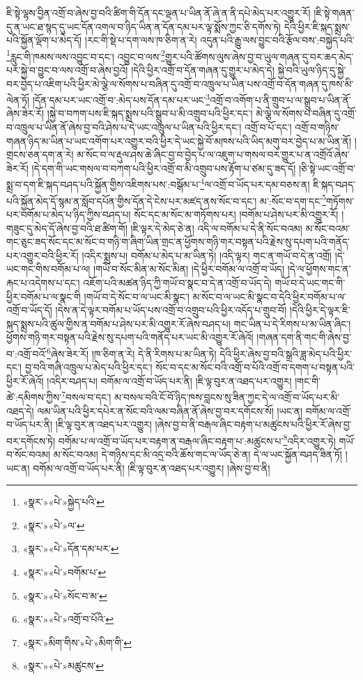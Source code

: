 ཇི་སྟེ་ལྷས་བྱིན་འགྲོ་བ་ཞེས་བྱ་བའི་ཚིག་གི་དོན་དང་ལྡན་པ་ཡིན་ནོ་ཞེ་ན་ནི་དཔེ་མེད་པར་འགྱུར་རོ། །ཇི་སྟེ་གཞན་དུ་ན་ཡང་ཐ་སྙད་དུ་ཡང་དོན་འགལ་བ་ཉིད་ཡིན་ན་དོན་དམ་པར་ལྟ་སྨོས་ཀྱང་ཅི་དགོས་ཏེ། དེའི་ཕྱིར་ཇི་སྐད་སྨྲས་པའི་སྐྱོན་ལྡོག་པ་མེད་དོ། །རང་གི་སྡེ་པ་དག་ལས་ཁ་ཅིག་ན་རེ། འདུན་པའི་རྒྱུ་ལས་བྱུང་བའི་རྩོལ་བས་:བསྐྱེད་པའི་\footnote{«སྣར་»«པེ་»སྐྱེད་པའི་}རླུང་གི་ཁམས་ལས་འབྱུང་བ་དང་། འབྱུང་བ་ལས་\footnote{«སྣར་»«པེ་»ལ་}གྱུར་པའི་ཚོགས་ལུས་ཞེས་བྱ་བ་ཡུལ་གཞན་དུ་བར་ཆད་མེད་པར་སྐྱེ་བ་བྱུང་བ་ལས་འགྲོ་བ་ཞེས་བྱའོ། །དེའི་ཕྱིར་འགྲོ་བ་དོན་གཞན་དུ་གྱུར་པ་མེད་དེ། སྐྱེ་བའི་ཡུལ་ཉིད་དུ་སྐྱེ་བར་བྱེད་པ་འཇིག་པའི་ཕྱིར་མེ་ལྕེ་ལ་སོགས་པ་བཞིན་དུ་འགྲོ་བ་འཁྲུལ་པ་ཡིན་པས་འགྲོ་བ་དོན་གཞན་དུ་ཁས་མི་ལེན་ཏོ། །དོན་དམ་པར་ཡང་འགྲོ་བ་:མེད་པས་དོན་དམ་པར་ཡང་\footnote{«སྣར་»«པེ་»དོན་དམ་པར་}འགྲོ་བ་འགོག་པ་ནི་གྲུབ་པ་ལ་སྒྲུབ་པ་ཡིན་ནོ་ཞེས་ཟེར་རོ། །སྐྱེ་བ་བཀག་པས་ཇི་སྐད་སྨྲས་པའི་སྒྲུབ་པ་མི་འགྲུབ་པའི་ཕྱིར་དང་། མེ་ལྕེ་ལ་སོགས་པ་བཞིན་དུ་འགྲོ་བ་འཁྲུལ་པ་ཡིན་ནོ་ཞེས་བྱ་བའི་ཤེས་པ་དེ་ཡང་འཁྲུལ་པ་ཡིན་པའི་ཕྱིར་དང་། འགྲོ་བ་པོ་དང་། འགྲོ་བ་གཉིས་གཞན་ཉིད་མ་ཡིན་པ་ཡང་འགོག་པར་འགྱུར་བའི་ཕྱིར་དེ་ཡང་སྐྱེ་བོ་མཁས་པའི་ཡིད་མགུ་བར་བྱེད་པ་མ་ཡིན་ནོ། །གྲངས་ཅན་དག་ན་རེ། མ་སོང་བ་ལ་རྡུལ་ཤས་ཆེ་ཞིང་བྱ་བ་བྱེད་པ་ལ་འཇུག་པ་གསལ་བར་གྱུར་པ་ན་འགྲོའོ་ཞེས་ཟེར་རོ། །དེ་དག་གི་ཡང་གསལ་བ་བཀག་པའི་ཕྱིར་འགྲོ་བ་མི་འགྲུབ་པས་རྟོག་པ་ཙམ་དུ་ཟད་དོ། །ཅི་སྟེ་ཡང་འགྲོ་བ་སྨྲ་བ་དག་ཇི་སྐད་བཤད་པའི་སྐྱོན་གྱིས་འཇིགས་པས་:བསྒོམ་པ་\footnote{«སྣར་»«པེ་»བགོམ་པ་}ལ་འགྲོ་བ་ཡོད་པར་དམ་བཅས་ན། ཇི་སྐད་བཤད་པའི་སྐྱོན་མེད་དོ་སྙམ་ན་སློབ་དཔོན་གྱིས་དོན་དེ་ངེས་པར་མཛད་ནས་སོང་བ་དང་། མ་:སོང་བ་དག་དང་\footnote{«སྣར་»«པེ་»སོང་བ་མ་}གཏོགས་པར་བགོམ་པ་མེད་པ་ཉིད་ཀྱིས་བཤད་པ། སོང་དང་མ་སོང་མ་གཏོགས་པར། །བགོམ་པ་ཤེས་པར་མི་འགྱུར་རོ། །གཟུང་དུ་མེད་དོ་ཞེས་བྱ་བའི་ཐ་ཚིག་གོ། །ཇི་ལྟར་དེ་མེད་ཅེ་ན། འདི་ལ་བགོམ་པ་དེ་ནི་སོང་བའམ། མ་སོང་བའམ་གང་ཅུང་ཟད་སོང་དང་མ་སོང་བ་གཉི་ག་ཞིག་ཡིན་གྲང་ན་ཕྱོགས་གཉི་གར་བསྟན་པའི་རྗེས་སུ་དཔག་པའི་གནོད་པར་འགྱུར་བའི་ཕྱིར་རོ། །འདིར་སྨྲས་པ། བགོམ་པ་མེད་པ་མ་ཡིན་ཏེ། །འདི་ལྟར། གང་ན་གཡོ་བ་དེ་ན་འགྲོ། །དེ་ཡང་གང་གིས་བགོམ་པ་ལ། །གཡོ་བ་སོང་མིན་མ་སོང་མིན། །དེ་ཕྱིར་བགོམ་ལ་འགྲོ་བ་ཡོད། །དེ་ལ་ཕྱོགས་གང་ན་རྐང་པ་འདེགས་པ་དང་། འཇོག་པའི་མཚན་ཉིད་ཀྱི་གཡོ་བ་སྣང་བ་དེ་ན་འགྲོ་བ་ཡོད་དེ། གཡོ་བ་དེ་ཡང་གང་གི་ཕྱིར་བགོམ་པ་ལ་སྣང་གི །གཡོ་བ་དེ་སོང་བ་ལ་ཡང་མི་སྣང་། མ་སོང་བ་ལ་ཡང་མི་སྣང་བ་དེའི་ཕྱིར་བགོམ་པ་ལ་འགྲོ་བ་ཡོད་དོ། །དེས་ན་དེ་ལྟར་བགོམ་པ་ཡོད་པས་འགྲོ་བ་འགྲུབ་པའི་ཕྱིར་འདོད་པ་གྲུབ་བོ། །དེའི་ཕྱིར་དེ་ལྟར་ཇི་སྐད་སྨྲས་པའི་ཚུལ་གྱིས་ན་བགོམ་པ་ཤེས་པར་མི་འགྱུར་རོ་ཞེས་བཤད་པ། གང་ཡིན་པ་དེ་རིགས་པ་མ་ཡིན་ཞིང་། ཕྱོགས་གཉི་གར་བསྟན་པའི་རྗེས་སུ་དཔག་པའི་གནོད་པར་ཡང་མི་འགྱུར་རོ་ཞེའོ། །གཞན་དག་ནི་གང་གི་ཞེས་བྱ་བ་:འགྲོ་བའོ་\footnote{«སྣར་»«པེ་»འགྲོ་བ་པོའི་}ཞེས་ཟེར་རོ། །ཁ་ཅིག་ན་རེ། དེ་ནི་རིགས་པ་མ་ཡིན་ཏེ། དེའི་ཕྱིར་ཞེས་བྱ་བའི་སྒྲའི་ཟླ་མེད་པའི་ཕྱིར་དང་། བྱ་བའི་གཞི་འཁྲུལ་པ་མེད་པའི་ཕྱིར་དང་། སོང་བ་དང་མ་སོང་བའི་འགྲོ་བ་པོའི་འགྲོ་བ་དགག་པ་བསྟན་པའི་ཕྱིར་རོ་ཞེའོ། །འདིར་བཤད་པ། བགོམ་ལ་འགྲོ་བ་ཡོད་པར་ནི། །ཇི་ལྟ་བུར་ན་འཐད་པར་འགྱུར། །གང་གི་ཚེ་:དམིགས་ཀྱིས་\footnote{«སྣར་»མིག་གིས་«པེ་»མིག་གི་}བསལ་བ་དང་། མ་བསལ་བའི་ངོ་བོ་ཉིད་ཁས་བླངས་སུ་ཟིན་ཀྱང་དེ་ལ་འགྲོ་བ་ཡོད་པར་མི་འཐད་དེ། ལམ་ཡིན་པའི་ཕྱིར་དཔེར་ན་སོང་བའི་ལམ་བཞིན་ནོ་ཞེས་བྱ་བར་དགོངས་སོ། །ཡང་ན། བགོམ་ལ་འགྲོ་བ་ཡོད་པར་ནི། །ཇི་ལྟ་བུར་ན་འཐད་པར་འགྱུར། །ཞེས་བྱ་བ་ནི་བརྒལ་ཞིང་བརྟག་པ་མཚུངས་པའི་ཕྱིར་རོ་ཞེས་བྱ་བར་དགོངས་ཏེ། བགོམ་པ་ལ་འགྲོ་བ་ཡོད་པར་བརྟག་ན་བརྒལ་ཞིང་བརྟག་པ་:མཚུངས་པ་\footnote{«སྣར་»«པེ་»མཚུངས་}འདིར་འགྱུར་ཏེ། གཡོ་བ་སོང་བའམ། མ་སོང་བའམ། དེ་གཉིས་དང་མི་འདྲ་བའི་ཆོས་གང་ལ་ཡོད་ཅེ་ན། དེ་ལ་ཡང་སྐྱོན་བཤད་ཟིན་ཏོ། །ཡང་ན། བགོམ་ལ་འགྲོ་བ་ཡོད་པར་ནི། །ཇི་ལྟ་བུར་ན་འཐད་པར་འགྱུར། །ཞེས་བྱ་བ་ནི། 